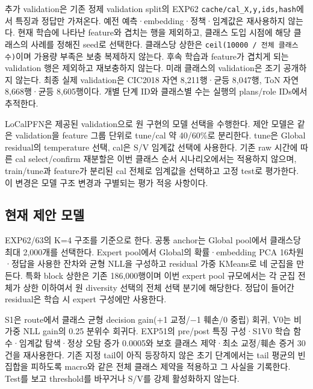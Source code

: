 추가 validation은 기존 정제 validation split의 EXP62 \texttt{cache/\allowbreak{}\allowbreak{}ca\allowbreak{}l\_\allowbreak{}\allowbreak{}X,\allowbreak{}y,\allowbreak{}id\allowbreak{}s,\allowbreak{}hash}에서 특징과 정답만 가져온다. 예전 예측·embedding·정책·임계값은 재사용하지 않는다. 현재 학습에 나타난 feature와 겹치는 행을 제외하고, 클래스 도입 시점에 해당 클래스의 사례를 정해진 seed로 선택한다. 클래스당 상한은 \texttt{ceil(100\allowbreak{}00 /\allowbreak{}\allowbreak{} 전체 \allowbreak{}클래스 수)}이며 가용량 부족은 보충 복제하지 않는다. 후속 학습과 feature가 겹치게 되는 validation 행은 제외하고 재보충하지 않는다. 미래 클래스의 validation은 조기 공개하지 않는다. 최종 실제 validation은 CIC2018 자연 8,211행·균등 8,047행, ToN 자연 8,668행·균등 8,605행이다. 개별 단계 ID와 클래스별 수는 실행의 plans/\allowbreak{}role IDs에서 추적한다.

LoCalPFN은 제공된 validation으로 원 구현의 모델 선택을 수행한다. 제안 모델은 같은 validation을 feature 그룹 단위로 tune/\allowbreak{}cal 약 40/\allowbreak{}60\%로 분리한다. tune은 Global residual의 temperature 선택, cal은 S/\allowbreak{}V 임계값 선택에 사용한다. 기존 raw 시간에 따른 cal select/\allowbreak{}confirm 재분할은 이번 클래스 순서 시나리오에서는 적용하지 않으며, train/\allowbreak{}tune과 feature가 분리된 cal 전체로 임계값을 선택하고 고정 test로 평가한다. 이 변경은 모델 구조 변경과 구별되는 평가 적응 사항이다.

\subsection{현재 제안 모델}
EXP62/\allowbreak{}63의 K=\allowbreak{}4 구조를 기준으로 한다. 공통 anchor는 Global pool에서 클래스당 최대 2,000개를 선택한다. Expert pool에서 Global의 확률·embedding PCA 16차원·정답을 사용한 잔차와 균형 NLL을 구성하고 residual 가중 KMeans로 네 군집을 만든다. 특화 block 상한은 기존 186,000행이며 이번 expert pool 규모에서는 각 군집 전체가 상한 이하여서 원 diversity 선택의 전체 선택 분기에 해당한다. 정답이 들어간 residual은 학습 시 expert 구성에만 사용한다.

S1은 route에서 클래스 균형 decision gain(+\allowbreak{}1 교정/\allowbreak{}−1 훼손/\allowbreak{}0 중립) 회귀, V0는 비가중 NLL gain의 0.25 분위수 회귀다. EXP51의 pre/\allowbreak{}post 특징 구성·S1V0 학습 함수·임계값 탐색·정상 오탐 증가 0.0005와 보호 클래스 제약·최소 교정/\allowbreak{}훼손 증거 30건을 재사용한다. 기존 지정 tail이 아직 등장하지 않은 초기 단계에서는 tail 평균의 빈 집합을 피하도록 macro와 같은 전체 클래스 제약을 적용하고 그 사실을 기록한다. Test를 보고 threshold를 바꾸거나 S/\allowbreak{}V를 강제 활성화하지 않는다.

